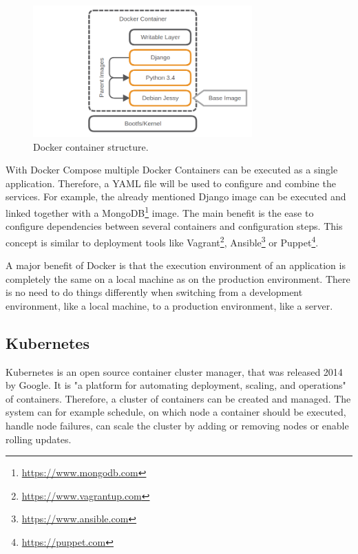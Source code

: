 \begin{figure}[H]
    \centering
    \includegraphics[width=0.75\textwidth]{resources/images/docker_container_structure.png}
    \caption[Docker container structure]{Docker container structure.}
    \label{fig:docker_container_structure}
\end{figure}

With Docker Compose multiple Docker Containers can be executed as a single application.
Therefore, a YAML file will be used to configure and combine the services.
For example, the already mentioned Django image can be executed and linked together with a MongoDB\footnote{\url{https://www.mongodb.com}} image.
The main benefit is the ease to configure dependencies between several containers and configuration steps.
This concept is similar to deployment tools like Vagrant\footnote{\url{https://www.vagrantup.com}}, Ansible\footnote{\url{https://www.ansible.com}} or Puppet\footnote{\url{https://puppet.com}}.

A major benefit of Docker is that the execution environment of an application is completely the same on a local machine as on the production environment.\autocite[cf.][p. 2]{Gallagher:2015}
There is no need to do things differently when switching from a development environment, like a local machine, to a production environment, like a server.\autocite[cf.][p. 2]{Gallagher:2015}

\subsection{Kubernetes}
\label{subsection:state-of-the-art:kubernetes}
Kubernetes is an open source container cluster manager, that was released 2014 by Google.
It is "a platform for automating deployment, scaling, and operations"\autocite[p. 1]{Grant:2015} of containers.
Therefore, a cluster of containers can be created and managed.
The system can for example schedule, on which node a container should be executed, handle node failures, can scale the cluster by adding or removing nodes or enable rolling updates.\autocite[cf.][p. 5 f.]{Grant:2015}

